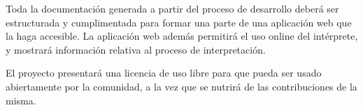 Toda la documentación generada a partir del proceso de desarrollo deberá ser estructurada y cumplimentada para 
formar una parte de una aplicación web que la haga accesible. La aplicación web además permitirá el uso online del intérprete, y mostrará información relativa al proceso de interpretación.

El proyecto presentará una licencia de uso libre para que pueda ser usado abiertamente por la comunidad,  a la vez que se nutrirá de las contribuciones de la misma. 

